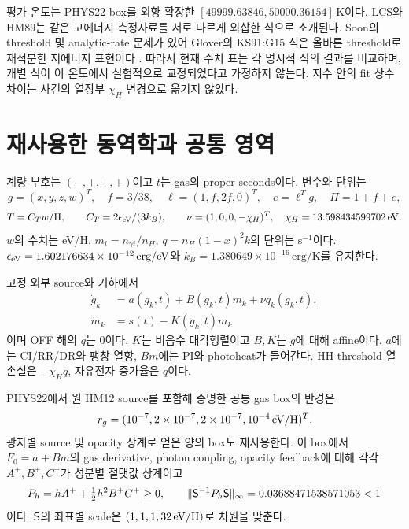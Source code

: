 \documentclass[11pt,a4paper]{article}
\begin{document}
평가 온도는 PHYS22 box를 외향 확장한 $[49999.63846,50000.36154]\,\mathrm K$이다. LCS와 HM89는 같은 고에너지 측정자료를 서로 다르게 외삽한 식으로 소개된다. Soon의 threshold 및 analytic-rate 문제가 있어 Glover의 KS91:G15 식은 올바른 threshold로 재적분한 저에너지 표현이다 \cite{glover,barklem}. 따라서 현재 수치 표는 각 명시적 식의 결과를 비교하며, 개별 식이 이 온도에서 실험적으로 교정되었다고 가정하지 않는다. 지수 안의 fit 상수 차이는 사건의 열장부 $\chi_H$ 변경으로 옮기지 않았다.

\newpage
\section{재사용한 동역학과 공통 영역}
계량 부호는 $(-,+,+,+)$이고 $t$는 gas의 proper seconds이다. 변수와 단위는
\begin{equation}
 g=(x,y,z,w)^T,\quad f=3/38,\quad
 \ell=(1,f,2f,0)^T,\quad e=\ell^Tg,\quad\Pi=1+f+e,
\end{equation}
\begin{equation}
 T=C_Tw/\Pi,\qquad C_T=2\epsilon_{\mathrm{eV}}/(3k_B),\qquad
 \nu=(1,0,0,-\chi_H)^T,\quad\chi_H=13.598434599702\,\mathrm{eV}.
\end{equation}
$w$의 수치는 eV/H, $m_i=n_{\gamma i}/n_H$, $q=n_H(1-x)^2k$의 단위는 $\mathrm s^{-1}$이다. $\epsilon_{\mathrm{eV}}=1.602176634\times10^{-12}\,\mathrm{erg/eV}$와 $k_B=1.380649\times10^{-16}\,\mathrm{erg/K}$를 유지한다.

고정 외부 source와 기하에서
\begin{align}
\dot g_k&=a(g_k,t)+B(g_k,t)m_k+\nu q_k(g_k,t),\\
\dot m_k&=s(t)-K(g_k,t)m_k
\end{align}
이며 OFF 해의 $q$는 0이다. $K$는 비음수 대각행렬이고 $B,K$는 $g$에 대해 affine이다. $a$에는 CI/RR/DR와 팽창 열항, $B m$에는 PI와 photoheat가 들어간다. HH threshold 열손실은 $-\chi_H q$, 자유전자 증가율은 $q$이다.

PHYS22에서 원 HM12 source를 포함해 증명한 공통 gas box의 반경은
\begin{equation}
r_g=(10^{-7},2\times10^{-7},2\times10^{-7},10^{-4}\,\mathrm{eV}/\mathrm H)^T.
\end{equation}
광자별 source 및 opacity 상계로 얻은 양의 box도 재사용한다. 이 box에서 $F_0=a+B m$의 gas derivative, photon coupling, opacity feedback에 대해 각각 $A^+,B^+,C^+$가 성분별 절댓값 상계이고
\begin{equation}
P_h=hA^++\tfrac12h^2B^+C^+\ge0,\qquad
\|\mathsf S^{-1}P_h\mathsf S\|_\infty=0.03688471538571053<1
\end{equation}
이다. $\mathsf S$의 좌표별 scale은 $(1,1,1,32\,\mathrm{eV}/\mathrm H)$로 차원을 맞춘다.
\end{document}
